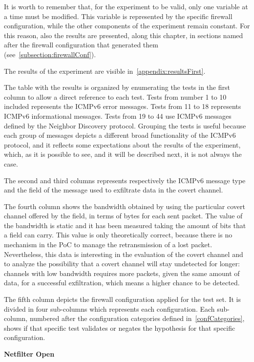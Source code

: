 \documentclass[12pt]{article}
\begin{document}
It is worth to remember that, for the experiment to be valid, only one variable at a time must be modified. This variable is represented by the specific firewall configuration, while the other components of the experiment remain constant. For this reason, also the results are presented, along this chapter, in sections named after the firewall configuration that generated them (see~\cref{subsection:firewallConf}).

The results of the experiment are visible in~\cref{appendix:resultsFirst}.

The table with the results is organized by enumerating the tests in the first column to allow a direct reference to each test. Tests from number 1 to 10 included represents the ICMPv6 error messages. Tests from 11 to 18 represents ICMPv6 informational messages. Tests from 19 to 44 use ICMPv6 messages defined by the Neighbor Discovery protocol. Grouping the tests is useful because each group of messages depicts a different broad functionality of the ICMPv6 protocol, and it reflects some expectations about the results of the experiment, which, as it is possible to see, and it will be described next, it is not always the case.

The second and third columns represents respectively the ICMPv6 message type and the field of the message used to exfiltrate data in the covert channel.

The fourth column shows the bandwidth obtained by using the particular covert channel offered by the field, in terms of bytes for each sent packet. The value of the bandwidth is static and it has been measured taking the amount of bits that a field can carry. This value is only theoretically correct, because there is no mechanism in the PoC to manage the retransmission of a lost packet. Nevertheless, this data is interesting in the evaluation of the covert channel and to analyze the possibility that a covert channel will stay undetected for longer: channels with low bandwidth requires more packets, given the same amount of data, for a successful exfiltration, which means a higher chance to be detected.

The fifth column depicts the firewall configuration applied for the test set. It is divided in four sub-columns which represents each configuration. Each sub-column, numbered after the configuration categories defined in~\cref{confCategories}, shows if that specific test validates or negates the hypothesis for that specific configuration.

\textbf{Netfilter Open}
\label{resultsFirstNetfilterOpen}
\end{document}
